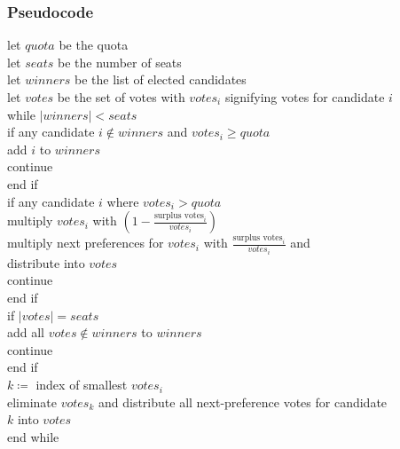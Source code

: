 \documentclass[12pt]{article}
\begin{document}
\subsubsection{Pseudocode}
\label{alg:stv psuedocode}
let $quota$ be the quota \\
let $seats$ be the number of seats \\
let $winners$ be the list of elected candidates \\
let $votes$ be the set of votes with $votes_{i}$ signifying votes for candidate $i$\\
while $\left\vert{winners}\right\vert < seats$\\
\tab if any candidate $i \notin winners$ and $votes_{i} \geq quota$ \\
\tab\tab add $i$ to $winners$ \\
\tab\tab continue \\
\tab end if \\
\tab if any candidate $i$ where $votes_{i} > quota$\\
\tab\tab multiply $votes_{i}$ with $(1 - \frac{\text{surplus votes}_{i}}{votes_{i}})$ \\
\tab\tab multiply next preferences for $votes_{i}$ with $\frac{\text{surplus votes}_{i}}{votes_{i}}$ and \\ \tab\tab distribute into $votes$\\
\tab\tab continue \\
\tab end if \\
\tab if $\left\vert{votes}\right\vert = seats$ \\
\tab\tab add all $votes \notin winners$ to $winners$ \\
\tab\tab continue \\
\tab end if \\
\tab $k \coloneqq$ index of smallest $votes_{i}$ \\
\tab eliminate $votes_{k}$ and distribute all next-preference votes for candidate \\
\tab $k$ into $votes$\\
end while
\end{document}
